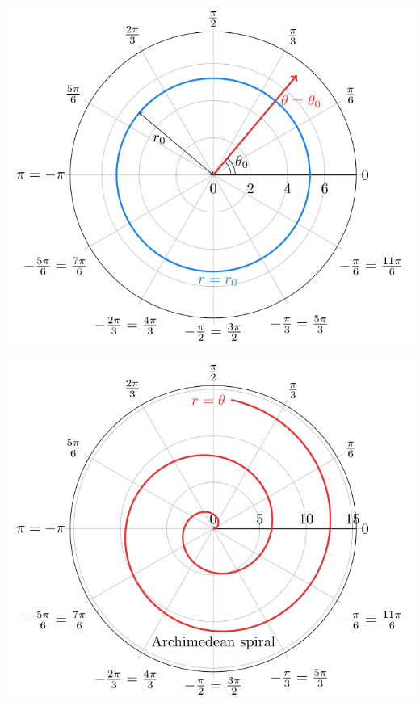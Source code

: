 \documentclass[
  12pt,
  oneside]{book}
\theoremstyle{definition}
\theoremstyle{definition}
\theoremstyle{definition}
\theoremstyle{definition}
\theoremstyle{remark}
\begin{document}
\begin{center}\includegraphics{t18-polar-pics-4} \end{center}

\begin{center}\includegraphics{t18-polar-pics-5} \end{center}
\end{document}
